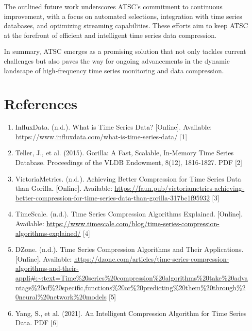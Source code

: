 \documentclass[conference]{IEEEtran}
\begin{document}
The outlined future work underscores ATSC's commitment to continuous improvement, with a focus on automated selections, integration with time series databases, and optimizing streaming capabilities. These efforts aim to keep ATSC at the forefront of efficient and intelligent time series data compression.

In summary, ATSC emerges as a promising solution that not only tackles current challenges but also paves the way for ongoing advancements in the dynamic landscape of high-frequency time series monitoring and data compression.

\section{References}

\begin{enumerate}
    \item InfluxData. (n.d.). What is Time Series Data? [Online]. Available: \url{https://www.influxdata.com/what-is-time-series-data/} [1]

    \item Teller, J., et al. (2015). Gorilla: A Fast, Scalable, In-Memory Time Series Database. Proceedings of the VLDB Endowment, 8(12), 1816-1827. PDF [2]

    \item VictoriaMetrics. (n.d.). Achieving Better Compression for Time Series Data than Gorilla. [Online]. Available: \href{https://faun.pub/victoriametrics-achieving-better-compression-for-time-series-data-than-gorilla-317bc1f95932}{https://faun.pub/victoriametrics-achieving-better-compression-for-time-series-data-than-gorilla-317bc1f95932} [3]

    \item TimeScale. (n.d.). Time Series Compression Algorithms Explained. [Online]. Available: \url{https://www.timescale.com/blog/time-series-compression-algorithms-explained/} [4]

    \item DZone. (n.d.). Time Series Compression Algorithms and Their Applications. [Online]. Available: \url{https://dzone.com/articles/time-series-compression-algorithms-and-their-appli#:~:text=Time%20series%20compression%20algorithms%20take%20advantage%20of%20specific,functions%20or%20predicting%20them%20through%20neural%20network%20models} [5]

    \item Yang, S., et al. (2021). An Intelligent Compression Algorithm for Time Series Data. PDF [6]


\end{enumerate}
\end{document}
